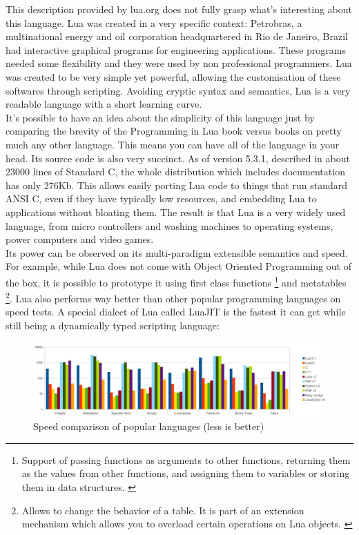 \documentclass{article}
\begin{document}
This description provided by lua.org does not fully grasp what's interesting about this language. Lua was created in a very specific context: Petrobras, a multinational energy and oil corporation headquartered in Rio de Janeiro, Brazil had interactive graphical programs for engineering applications. These programs needed some flexibility and they were used by non professional programmers. Lua was created to be very simple yet powerful, allowing the customisation of these softwares through scripting. Avoiding cryptic syntax and semantics, Lua is a very readable language with a short learning curve. \\

It's possible to have an idea about the simplicity of this language just by comparing the brevity of the Programming in Lua book versus books on pretty much any other language. This means you can have all of the language in your head. Its source code is also very succinct. As of version 5.3.1, described in about 23000 lines of Standard C, the whole distribution which includes documentation has only 276Kb. This allows easily porting Lua code to things that run standard ANSI C, even if they have typically low resources, and embedding Lua to applications without bloating them. The result is that Lua is a very widely used language, from micro controllers and washing machines to operating systems, power computers and video games.\\

Its power can be observed on its multi-paradigm extensible semantics and speed. For example, while Lua does not come with Object Oriented Programming out of the box, it is possible to prototype it using first class functions \footnote{Support of passing functions as arguments to other functions, returning them as the values from other functions, and assigning them to variables or storing them in data structures. \autocite{wikifunc}} and metatables \footnote{Allows to change the behavior of a table. It is part of an extension mechanism which allows you to overload certain operations on Lua objects. \autocite{luausersmeta} \autocite[117]{pil}}. Lua also performs way better than other popular programming languages on speed tests. A special dialect of Lua called LuaJIT is the fastest it can get while still being a dynamically typed scripting language\autocite[8]{modlua}: \\

\begin{figure}[h]
\includegraphics[scale=0.4]{speed.png}
\caption{\label{fig:speedcomparison} Speed comparison of popular languages (less is better)}
\end{figure}
\end{document}
